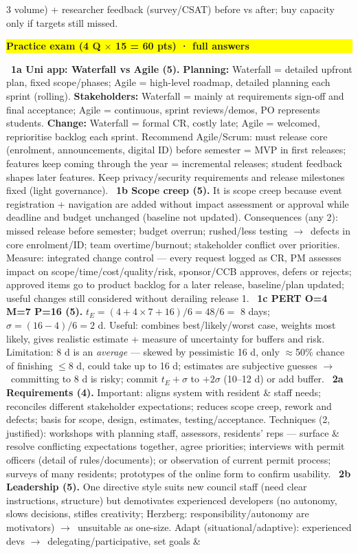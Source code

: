 \documentclass[a4paper,landscape]{article}
\newcommand{\hlhighlight}[1]{\begingroup\setlength{\fboxsep}{0pt}\colorbox{yellow}{\strut\textbf{#1}}\endgroup}
\newcommand{\concept}[1]{\textbf{#1}}
\newcommand{\lbl}[1]{\textbf{#1}}
\newcommand{\kh}[1]{{\setlength{\fboxsep}{0.5pt}\colorbox{keyhlcolor}{#1}}}
\newcommand{\ra}{$\rightarrow$}
\begin{document}
\begin{multicols}{3}
volume) + researcher feedback (survey/CSAT) before vs after; buy capacity only if targets still missed.\par

\par\smallskip\noindent\hlhighlight{Practice exam (4 Q $\times$ 15 = 60 pts) · full answers}\ \lbl{1a Uni app: Waterfall vs Agile (5).} \concept{Planning:} Waterfall = detailed upfront plan, fixed scope/phases; Agile = high-level roadmap, detailed planning each sprint (rolling). \concept{Stakeholders:} Waterfall = mainly at requirements sign-off and final acceptance; Agile = continuous, sprint reviews/demos, PO represents students. \concept{Change:} Waterfall = formal CR, costly late; Agile = welcomed, reprioritise backlog each sprint. \kh{Recommend Agile/Scrum}: must release core (enrolment, announcements, digital ID) before semester = MVP in first releases; features keep coming through the year = incremental releases; student feedback shapes later features. Keep privacy/security requirements and release milestones fixed (light governance). \textbullet\ \lbl{1b Scope creep (5).} It is scope creep because event registration + navigation are \kh{added without impact assessment or approval} while \kh{deadline and budget unchanged} (baseline not updated). Consequences (any 2): missed release before semester; budget overrun; rushed/less testing \ra\ defects in core enrolment/ID; team overtime/burnout; stakeholder conflict over priorities. Measure: \kh{integrated change control} --- every request logged as CR, PM assesses impact on scope/time/cost/quality/risk, sponsor/CCB approves, defers or rejects; approved items go to product backlog for a later release, baseline/plan updated; useful changes still considered without derailing release 1. \textbullet\ \lbl{1c PERT O=4 M=7 P=16 (5).} $t_E=(4+4\times7+16)/6=48/6=$ \kh{8 days}; $\sigma=(16-4)/6=2$ d. Useful: combines best/likely/worst case, weights most likely, gives realistic estimate + measure of uncertainty for buffers and risk. Limitation: 8 d is an \emph{average} --- skewed by pessimistic 16 d, only $\approx$50\% chance of finishing $\le$8 d, could take up to 16 d; estimates are subjective guesses \ra\ committing to 8 d is risky; commit $t_E+\sigma$ to $+2\sigma$ (10--12 d) or add buffer. \textbullet\ \lbl{2a Requirements (4).} Important: aligns system with resident \& staff needs; reconciles different stakeholder expectations; reduces scope creep, rework and defects; basis for scope, design, estimates, testing/acceptance. Techniques (2, justified): \kh{workshops} with planning staff, assessors, residents' reps --- surface \& resolve conflicting expectations together, agree priorities; \kh{interviews} with permit officers (detail of rules/documents); or \kh{observation} of current permit process; \kh{surveys} of many residents; \kh{prototypes} of the online form to confirm usability. \textbullet\ \lbl{2b Leadership (5).} One directive style suits new council staff (need clear instructions, structure) but \kh{demotivates experienced developers} (no autonomy, slows decisions, stifles creativity; Herzberg: responsibility/autonomy are motivators) \ra\ unsuitable as one-size. Adapt (\kh{situational/adaptive}): experienced devs \ra\ delegating/participative, set goals \& 
\end{multicols}
\end{document}
